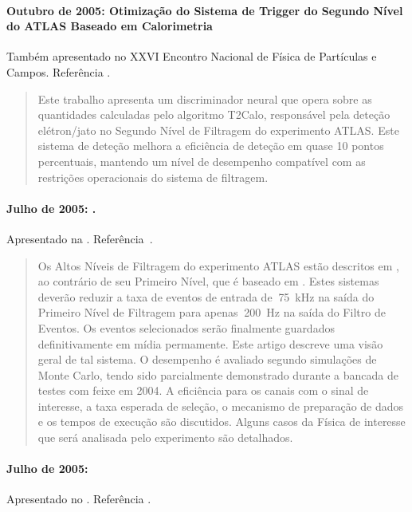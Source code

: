 \paragraph{Outubro de 2005: Otimização do Sistema de Trigger do Segundo Nível
do ATLAS Baseado em Calorimetria} Também apresentado no XXVI Encontro Nacional
de Física de Partículas e Campos. Referência \cite{aa:enfpc-05}.

\begin{quotation}
Este trabalho apresenta um discriminador neural que opera sobre as quantidades
calculadas pelo algoritmo T2Calo, responsável pela deteção elétron/jato no
Segundo Nível de Filtragem do experimento ATLAS. Este sistema de deteção
melhora a eficiência de deteção em quase 10 pontos percentuais, mantendo um
nível de desempenho compatível com as restrições operacionais do sistema de
filtragem.
\end{quotation}

\paragraph{Julho de 2005: .}
Apresentado na . Referência~\cite{aa:rt-05-01}.

\begin{quotation}
Os Altos Níveis de Filtragem do experimento ATLAS estão descritos em
, ao contrário de seu Primeiro Nível, que é baseado em
. Estes sistemas deverão reduzir a taxa de eventos de entrada de
$~$75~kHz na saída do Primeiro Nível de Filtragem para apenas $~$200~Hz na
saída do Filtro de Eventos. Os eventos selecionados serão finalmente guardados
definitivamente em mídia permamente. Este artigo descreve uma visão geral de
tal sistema. O desempenho é avaliado segundo simulações de Monte Carlo, tendo
sido parcialmente demonstrado durante a bancada de testes com feixe em 2004. A
eficiência para os canais com o sinal de interesse, a taxa esperada de
seleção, o mecanismo de preparação de dados e os tempos de execução são
discutidos. Alguns casos da Física de interesse que será analisada pelo
experimento são detalhados.
\end{quotation}

\paragraph{Julho de 2005: }
Apresentado no . Referência \cite{aa:rt-05}.

